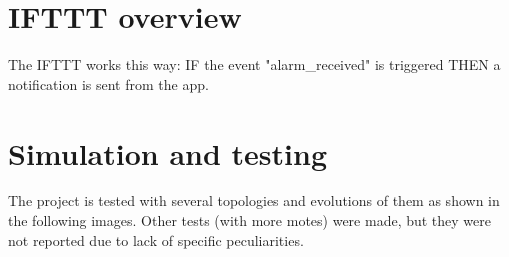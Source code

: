 \documentclass[11pt]{article}
\begin{document}
\section{IFTTT overview}
The IFTTT works this way: \newline
IF the event "alarm\_received" is triggered \newline
THEN a notification is sent from the app. \newline

\section{Simulation and testing}
The project is tested with several topologies and evolutions of them as shown in the following images. Other tests (with more motes) were made, but they were not reported due to lack of specific peculiarities. \newline

\end{document}

